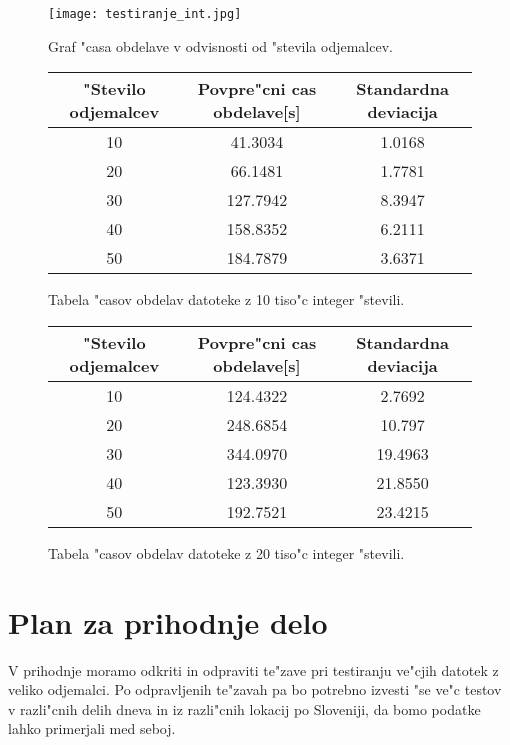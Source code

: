 \begin{figure}
  \centering
    \texttt{[image: testiranje\_int.jpg]}
  \caption{Graf "casa obdelave v odvisnosti od "stevila odjemalcev.}
  \label{8_test1}  
\end{figure}

\begin{figure}[!htbp]
  \centering
  \begin{tabular}{ | c | c | c | }
    \hline
    "Stevilo odjemalcev & Povpre"cni cas obdelave[s] & Standardna deviacija\\ \hline
    10 & 41.3034 & 1.0168 \\ \hline
    20 & 66.1481 & 1.7781 \\ \hline
    30 & 127.7942 & 8.3947 \\ \hline
    40 &158.8352 &  6.2111\\ \hline
    50 & 184.7879 &  3.6371\\ \hline
  \end{tabular}
  \caption{Tabela "casov obdelav datoteke z 10 tiso"c integer "stevili.}
  \label{8_table1}
  \centering
\end{figure}

\begin{figure}[!htbp]
  \centering
  \begin{tabular}{ | c | c | c | }
    \hline
    "Stevilo odjemalcev & Povpre"cni cas obdelave[s] & Standardna deviacija\\ \hline
    10 & 124.4322 & 2.7692 \\ \hline
    20 & 248.6854 & 10.797 \\ \hline
    30 & 344.0970 & 19.4963 \\ \hline
    40 & 123.3930 & 21.8550\\ \hline
    50 & 192.7521 & 23.4215\\ \hline
  \end{tabular}
  \caption{Tabela "casov obdelav datoteke z 20 tiso"c integer "stevili.}
  \label{8_table2}
  \centering
\end{figure}

\section{Plan za prihodnje delo}
V prihodnje moramo odkriti in odpraviti te"zave pri testiranju ve"cjih datotek z veliko odjemalci. Po odpravljenih te"zavah pa bo potrebno izvesti "se ve"c testov v razli"cnih delih dneva in iz razli"cnih lokacij po Sloveniji, da bomo podatke lahko primerjali med seboj. \\
